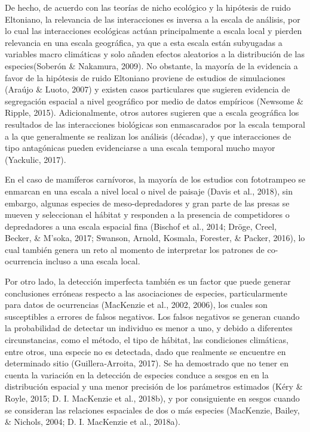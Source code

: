\documentclass[12pt,twoside]{reedthesis}
\begin{document}
De hecho, de acuerdo con las teorías de nicho ecológico y la hipótesis de ruido Eltoniano, la relevancia de las interacciones es inversa a la escala de análisis, por lo cual las interacciones ecológicas actúan principalmente a escala local y pierden relevancia en una escala geográfica, ya que a esta escala están subyugadas a variables macro climáticas y solo añaden efectos aleatorios a la distribución de las especies(Soberón \& Nakamura, 2009). No obstante, la mayoría de la evidencia a favor de la hipótesis de ruido Eltoniano proviene de estudios de simulaciones (Araújo \& Luoto, 2007) y existen casos particulares que sugieren evidencia de segregación espacial a nivel geográfico por medio de datos empíricos (Newsome \& Ripple, 2015). Adicionalmente, otros autores sugieren que a escala geográfica los resultados de las interacciones biológicas son enmascarados por la escala temporal a la que generalmente se realizan los análisis (décadas), y que interacciones de tipo antagónicas pueden evidenciarse a una escala temporal mucho mayor (Yackulic, 2017).

En el caso de mamíferos carnívoros, la mayoría de los estudios con fototrampeo se enmarcan en una escala a nivel local o nivel de paisaje (Davis et al., 2018), sin embargo, algunas especies de meso-depredadores y gran parte de las presas se mueven y seleccionan el hábitat y responden a la presencia de competidores o depredadores a una escala espacial fina (Bischof et al., 2014; Dröge, Creel, Becker, \& M'soka, 2017; Swanson, Arnold, Kosmala, Forester, \& Packer, 2016), lo cual también genera un reto al momento de interpretar los patrones de co-ocurrencia incluso a una escala local.

Por otro lado, la detección imperfecta también es un factor que puede generar conclusiones erróneas respecto a las asociaciones de especies, particularmente para datos de ocurrencias (MacKenzie et al., 2002, 2006), los cuales son susceptibles a errores de falsos negativos. Los falsos negativos se generan cuando la probabilidad de detectar un individuo es menor a uno, y debido a diferentes circunstancias, como el método, el tipo de hábitat, las condiciones climáticas, entre otros, una especie no es detectada, dado que realmente se encuentre en determinado sitio (Guillera‐Arroita, 2017). Se ha demostrado que no tener en cuenta la variación en la detección de especies conduce a sesgos en en la distribución espacial y una menor precisión de los parámetros estimados (Kéry \& Royle, 2015; D. I. MacKenzie et al., 2018b), y por consiguiente en sesgos cuando se consideran las relaciones espaciales de dos o más especies (MacKenzie, Bailey, \& Nichols, 2004; D. I. MacKenzie et al., 2018a).
\end{document}
